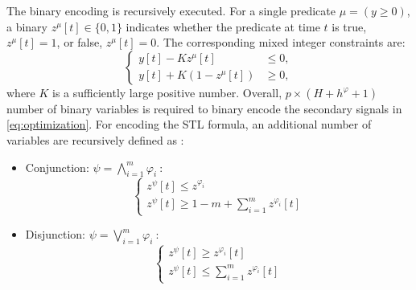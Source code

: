 \documentclass[letterpaper, 10 pt, conference]{ieeeconf}
\begin{document}
The binary encoding is recursively executed. For a single predicate $\mu=(y \geq 0)$, a binary $z^\mu[t] \in \{0,1\}$ indicates whether the predicate at time $t$ is true, $z^\mu[t]=1$, or false, $z^\mu[t]=0$. The corresponding mixed integer constraints are:
\begin{equation}
\left \{ 
\begin{array}{ll}
y[t]-Kz^\mu[t] & \le 0, \\
y[t]+K(1-z^\mu[t]) & \geq 0,
\end{array}
\right.
\end{equation}
where $K$ is a sufficiently large positive number. Overall, $p\times(H+h^\varphi+1)$ number of binary variables is required to binary encode the secondary signals in \eqref{eq:optimization}. 
For encoding the STL formula, an additional number of variables are recursively defined as \cite{raman}:
\begin{itemize}
\item Conjunction: $\psi=\bigwedge_{i=1}^m \varphi_i~$:
\begin{equation}
\left\{ 
\begin{array}{c}
z^\psi[t] \le z^{\varphi_i} \\
z^\psi[t] \ge 1-m+\sum \limits_{i=1}^m z^{\varphi_i}[t]
\end{array}
\right.
\end{equation}
\item Disjunction: $\psi=\bigvee_{i=1}^m \varphi_i~$:
\begin{equation}
\left\{ 
\begin{array}{c}
z^\psi[t] \ge z^{\varphi_i}[t] \\
z^\psi[t] \le \sum \limits_{i=1}^m z^{\varphi_i}[t]
\end{array}
\right.
\end{equation}
\end{itemize}
\end{document}
